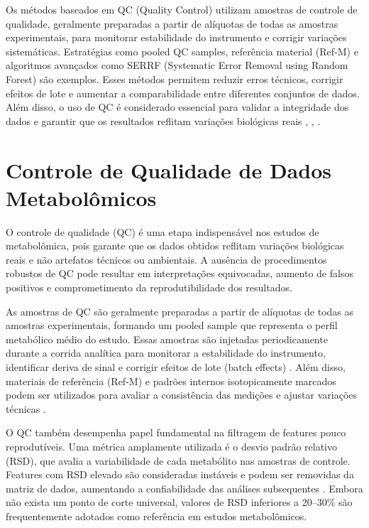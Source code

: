 Os métodos baseados em QC (Quality Control) utilizam amostras de controle de qualidade, geralmente preparadas a partir de alíquotas de todas as amostras experimentais, para monitorar estabilidade do instrumento e corrigir variações sistemáticas. Estratégias como pooled QC samples, referência material (Ref-M) e algoritmos avançados como SERRF (Systematic Error Removal using Random Forest) são exemplos. Esses métodos permitem reduzir erros técnicos, corrigir efeitos de lote e aumentar a comparabilidade entre diferentes conjuntos de dados. Além disso, o uso de QC é considerado essencial para validar a integridade dos dados e garantir que os resultados reflitam variações biológicas reais \cite{yao2022normalization}, \cite{fan2019systematic}, \cite{drotleff2019guidelines}.

\section{\textbf{Controle de Qualidade de Dados Metabolômicos}}

O controle de qualidade (QC) é uma etapa indispensável nos estudos de metabolômica, pois garante que os dados obtidos reflitam variações biológicas reais e não artefatos técnicos ou ambientais. A ausência de procedimentos robustos de QC pode resultar em interpretações equivocadas, aumento de falsos positivos e comprometimento da reprodutibilidade dos resultados\cite{datanor}. 

As amostras de QC são geralmente preparadas a partir de alíquotas de todas as amostras experimentais, formando um pooled sample que representa o perfil metabólico médio do estudo. Essas amostras são injetadas periodicamente durante a corrida analítica para monitorar a estabilidade do instrumento, identificar deriva de sinal e corrigir efeitos de lote (batch effects) \cite{fan2019systematic}. Além disso, materiais de referência (Ref-M) e padrões internos isotopicamente marcados podem ser utilizados para avaliar a consistência das medições e ajustar variações técnicas \cite{drotleff2019guidelines}.

O QC também desempenha papel fundamental na filtragem de features pouco reprodutíveis. Uma métrica amplamente utilizada é o desvio padrão relativo (RSD), que avalia a variabilidade de cada metabólito nas amostras de controle. Features com RSD elevado são consideradas instáveis e podem ser removidas da matriz de dados, aumentando a confiabilidade das análises subsequentes \cite{yao2022normalization}. Embora não exista um ponto de corte universal, valores de RSD inferiores a 20–30\% são frequentemente adotados como referência em estudos metabolômicos.

